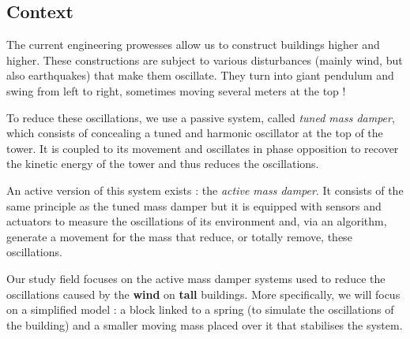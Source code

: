 \subsection{Context}
The current engineering prowesses allow us to construct buildings higher and higher. These constructions are subject to various disturbances (mainly wind, but also earthquakes) that make them oscillate. They turn into giant pendulum and swing from left to right, sometimes moving several meters at the top !\cite{YouTube_minutephysics}\par
To reduce these oscillations, we use a passive system, called {\it tuned mass damper}, which consists of concealing a tuned and harmonic oscillator at the top of the tower. It is coupled to its movement and oscillates in phase opposition to recover the kinetic energy of the tower and thus reduces the oscillations.\cite{Wikipedia_amortisseur_tmd}\par
An active version of this system exists : the {\it active mass damper}. It consists of the same principle as the tuned mass damper but it is equipped with sensors and actuators to measure the oscillations of its environment and, via an algorithm, generate a movement for the mass that reduce, or totally remove, these oscillations.\cite{sciencedirect_amd}\par
Our study field focuses on the active mass damper systems used to reduce the oscillations caused by the {\bf wind} on {\bf tall} buildings. More specifically, we will focus on a simplified model : a block linked to a spring (to simulate the oscillations of the building) and a smaller moving mass placed over it that stabilises the system.

